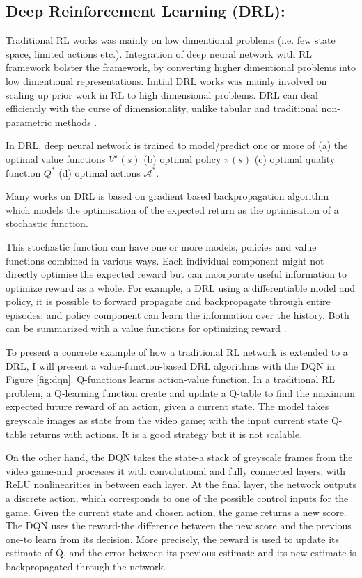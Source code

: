 \subsection{Deep Reinforcement Learning (DRL):}
Traditional RL works was mainly on low dimentional problems (i.e. few state space, limited actions etc.). Integration of deep neural network with RL framework bolster the framework, by converting higher dimentional problems into low dimentional representations. Initial DRL works was mainly involved on scaling up prior work in RL to high dimensional problems.
DRL can deal
efficiently with the curse of dimensionality, unlike tabular and
traditional non-parametric methods \cite{bengio2013representation}.

In DRL, deep neural network is trained to model/predict one or more of (a) the optimal value functions $V^\pi(s)$ (b) optimal policy $\pi(s)$
(c) optimal quality function $Q^*$ (d) optimal actions $\mathcal{A}^*$.

Many works on DRL is based on gradient based backpropagation algorithm \cite{heess2015learning, schulman2015gradient, rumelhart1985learning} which models the optimisation
of the expected return as the optimisation of a
stochastic function.

This stochastic function can have one or more
models, policies and value functions combined in various ways.
Each individual component might not directly optimise the expected reward but can incorporate useful information to optimize reward as a whole.
For example, a DRL using a differentiable model and policy,
it is possible to forward propagate and backpropagate through
entire episodes; and policy component can learn the information over the history. Both can be summarized with a value functions for optimizing reward \cite{heess2015learning}.

To present a concrete example of how a traditional RL network is extended to a DRL, I will present a value-function-based DRL algorithms
with the DQN in Figure \ref{fig:dqn}.
Q-functions learns action-value function. In a traditional RL problem, a Q-learning function create and update a Q-table to find the maximum expected future reward of an action, given a current state. The model takes greyscale images as state from the video game; with the input current state Q-table returns with actions. It is a good strategy but it is not scalable.

On the other hand, the DQN takes the state-a stack of greyscale frames from the video game-and processes it with convolutional and
fully connected layers, with ReLU nonlinearities in between each layer. At the final layer, the network outputs a discrete action, which corresponds to one of the possible control inputs for the game.  Given the current state and chosen action, the game returns a new score.
The DQN uses the reward-the difference
between the new score and the previous one-to learn from its decision. More precisely, the reward is used to update its estimate of Q, and the error between its previous estimate and its new estimate is backpropagated through the network.


